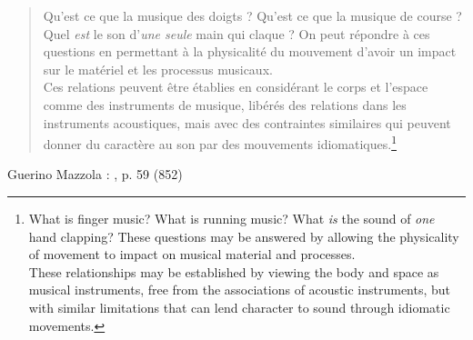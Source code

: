 \begin{quotation}
Qu'est ce que la musique des doigts ? Qu'est ce que la musique de course ? Quel \textit{est} le son d'\textit{une seule} main qui claque ? On peut répondre à ces questions en permettant à la physicalité du mouvement d'avoir un impact sur le matériel et les processus musicaux.\\
Ces relations peuvent être établies en considérant le corps et l'espace comme des instruments de musique, libérés des relations dans les instruments acoustiques, mais avec des contraintes similaires qui peuvent donner du caractère au son par des mouvements idiomatiques.\footnote{What is finger music? What is running music? What \textit{is} the sound of \textit{one} hand clapping? These questions may be answered by allowing the physicality of movement to impact on musical material and processes.\\
These relationships may be established by viewing the body and space as musical instruments, free from the associations of acoustic instruments, but with similar limitations that can lend character to sound through idiomatic movements.}
\end{quotation}









Guerino Mazzola :  \cite{mazzola_topos_2018}, p. 59 (852)

